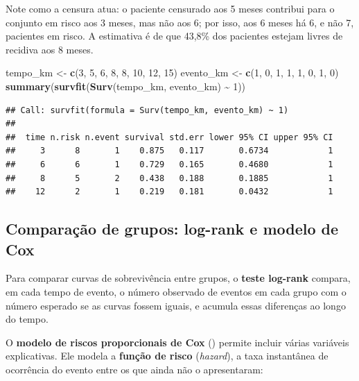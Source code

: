 \documentclass[
]{book}
\newenvironment{Shaded}{\begin{snugshade}}{\end{snugshade}}
\newcommand{\DecValTok}[1]{\textcolor[rgb]{0.00,0.00,0.81}{#1}}
\newcommand{\FunctionTok}[1]{\textcolor[rgb]{0.13,0.29,0.53}{\textbf{#1}}}
\newcommand{\NormalTok}[1]{#1}
\newcommand{\OtherTok}[1]{\textcolor[rgb]{0.56,0.35,0.01}{#1}}
\newcommand{\SpecialCharTok}[1]{\textcolor[rgb]{0.81,0.36,0.00}{\textbf{#1}}}
\begin{document}
Note como a censura atua: o paciente censurado aos 5 meses contribui para o conjunto em risco aos 3 meses, mas não aos 6; por isso, aos 6 meses há 6, e não 7, pacientes em risco. A estimativa é de que 43,8\% dos pacientes estejam livres de recidiva aos 8 meses.

\begin{Shaded}
\begin{Highlighting}[]
\NormalTok{tempo\_km }\OtherTok{\textless{}{-}} \FunctionTok{c}\NormalTok{(}\DecValTok{3}\NormalTok{, }\DecValTok{5}\NormalTok{, }\DecValTok{6}\NormalTok{, }\DecValTok{8}\NormalTok{, }\DecValTok{8}\NormalTok{, }\DecValTok{10}\NormalTok{, }\DecValTok{12}\NormalTok{, }\DecValTok{15}\NormalTok{)}
\NormalTok{evento\_km }\OtherTok{\textless{}{-}} \FunctionTok{c}\NormalTok{(}\DecValTok{1}\NormalTok{, }\DecValTok{0}\NormalTok{, }\DecValTok{1}\NormalTok{, }\DecValTok{1}\NormalTok{, }\DecValTok{1}\NormalTok{, }\DecValTok{0}\NormalTok{, }\DecValTok{1}\NormalTok{, }\DecValTok{0}\NormalTok{)}
\FunctionTok{summary}\NormalTok{(}\FunctionTok{survfit}\NormalTok{(}\FunctionTok{Surv}\NormalTok{(tempo\_km, evento\_km) }\SpecialCharTok{\textasciitilde{}} \DecValTok{1}\NormalTok{))}
\end{Highlighting}
\end{Shaded}

\begin{verbatim}
## Call: survfit(formula = Surv(tempo_km, evento_km) ~ 1)
## 
##  time n.risk n.event survival std.err lower 95% CI upper 95% CI
##     3      8       1    0.875   0.117       0.6734            1
##     6      6       1    0.729   0.165       0.4680            1
##     8      5       2    0.438   0.188       0.1885            1
##    12      2       1    0.219   0.181       0.0432            1
\end{verbatim}

\subsection{Comparação de grupos: log-rank e modelo de Cox}\label{comparauxe7uxe3o-de-grupos-log-rank-e-modelo-de-cox}

Para comparar curvas de sobrevivência entre grupos, o \textbf{teste log-rank} compara, em cada tempo de evento, o número observado de eventos em cada grupo com o número esperado se as curvas fossem iguais, e acumula essas diferenças ao longo do tempo.

O \textbf{modelo de riscos proporcionais de Cox} () permite incluir várias variáveis explicativas. Ele modela a \textbf{função de risco} (\emph{hazard}), a taxa instantânea de ocorrência do evento entre os que ainda não o apresentaram:
\end{document}
